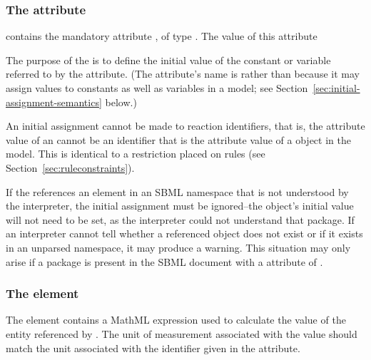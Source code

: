 \subsubsection{The  attribute}

\InitialAssignment contains the mandatory attribute
, of type .  The value of this
attribute 

The purpose of the
\InitialAssignment is to define the initial value of the constant
or variable referred to by the  attribute.  (The
attribute's name is  rather than 
because it may assign values to constants as well as variables in
a model; see Section~\ref{sec:initial-assignment-semantics}
below.)

An initial assignment cannot be made to reaction identifiers, that
is, the  attribute value of an \InitialAssignment cannot
be an identifier that is the  attribute value of a \Reaction
object in the model.  This is identical to a restriction placed on
rules (see Section~\ref{sec:ruleconstraints}).


\begin{blockChanged}
If the  references an element in an SBML namespace that is not
  understood by the interpreter, the initial assignment must be ignored--the 
  object's initial value will not need to be set, as the interpreter could not
  understand that package.  If an interpreter cannot tell whether 
  a referenced object does not exist or if it exists in an unparsed namespace,
  it may produce a warning.  This situation may only arise if a package is present in the SBML document with a  attribute of .
\end{blockChanged}

\subsubsection{The  element}

The  element contains a MathML expression used to
calculate the value of the entity referenced by .
The unit of measurement associated with the value should match the
unit associated with the identifier given in the 
attribute.


